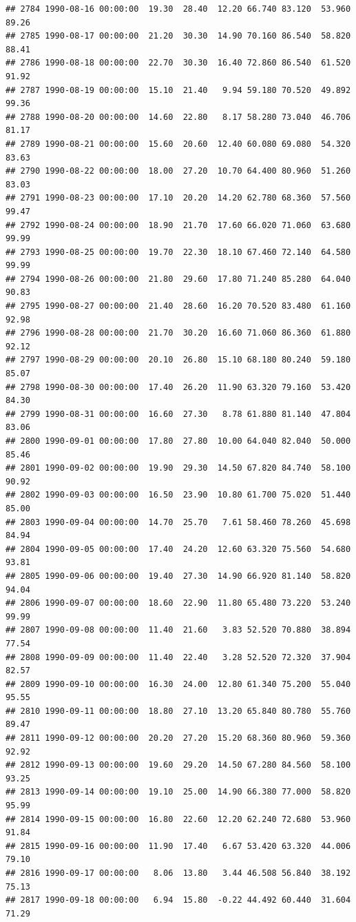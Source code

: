 \documentclass{article}\usepackage{graphicx, color}
\makeatletter
\newenvironment{kframe}{%
 \def\at@end@of@kframe{}%
 \ifinner\ifhmode%
  \def\at@end@of@kframe{\end{minipage}}%
  \begin{minipage}{\columnwidth}%
 \fi\fi%
 \def\FrameCommand##1{\hskip\@totalleftmargin \hskip-\fboxsep
 \colorbox{shadecolor}{##1}\hskip-\fboxsep
     \hskip-\linewidth \hskip-\@totalleftmargin \hskip\columnwidth}%
 \MakeFramed {\advance\hsize-\width
   \@totalleftmargin\z@ \linewidth\hsize
   \@setminipage}}%
 {\par\unskip\endMakeFramed%
 \at@end@of@kframe}
\newenvironment{knitrout}{}{} %
\makeatother
\begin{document}
\begin{knitrout}
\begin{kframe}
\begin{verbatim}
## 2784 1990-08-16 00:00:00  19.30  28.40  12.20 66.740 83.120  53.960  89.26
## 2785 1990-08-17 00:00:00  21.20  30.30  14.90 70.160 86.540  58.820  88.41
## 2786 1990-08-18 00:00:00  22.70  30.30  16.40 72.860 86.540  61.520  91.92
## 2787 1990-08-19 00:00:00  15.10  21.40   9.94 59.180 70.520  49.892  99.36
## 2788 1990-08-20 00:00:00  14.60  22.80   8.17 58.280 73.040  46.706  81.17
## 2789 1990-08-21 00:00:00  15.60  20.60  12.40 60.080 69.080  54.320  83.63
## 2790 1990-08-22 00:00:00  18.00  27.20  10.70 64.400 80.960  51.260  83.03
## 2791 1990-08-23 00:00:00  17.10  20.20  14.20 62.780 68.360  57.560  99.47
## 2792 1990-08-24 00:00:00  18.90  21.70  17.60 66.020 71.060  63.680  99.99
## 2793 1990-08-25 00:00:00  19.70  22.30  18.10 67.460 72.140  64.580  99.99
## 2794 1990-08-26 00:00:00  21.80  29.60  17.80 71.240 85.280  64.040  90.83
## 2795 1990-08-27 00:00:00  21.40  28.60  16.20 70.520 83.480  61.160  92.98
## 2796 1990-08-28 00:00:00  21.70  30.20  16.60 71.060 86.360  61.880  92.12
## 2797 1990-08-29 00:00:00  20.10  26.80  15.10 68.180 80.240  59.180  85.07
## 2798 1990-08-30 00:00:00  17.40  26.20  11.90 63.320 79.160  53.420  84.30
## 2799 1990-08-31 00:00:00  16.60  27.30   8.78 61.880 81.140  47.804  83.06
## 2800 1990-09-01 00:00:00  17.80  27.80  10.00 64.040 82.040  50.000  85.46
## 2801 1990-09-02 00:00:00  19.90  29.30  14.50 67.820 84.740  58.100  90.92
## 2802 1990-09-03 00:00:00  16.50  23.90  10.80 61.700 75.020  51.440  85.00
## 2803 1990-09-04 00:00:00  14.70  25.70   7.61 58.460 78.260  45.698  84.94
## 2804 1990-09-05 00:00:00  17.40  24.20  12.60 63.320 75.560  54.680  93.81
## 2805 1990-09-06 00:00:00  19.40  27.30  14.90 66.920 81.140  58.820  94.04
## 2806 1990-09-07 00:00:00  18.60  22.90  11.80 65.480 73.220  53.240  99.99
## 2807 1990-09-08 00:00:00  11.40  21.60   3.83 52.520 70.880  38.894  77.54
## 2808 1990-09-09 00:00:00  11.40  22.40   3.28 52.520 72.320  37.904  82.57
## 2809 1990-09-10 00:00:00  16.30  24.00  12.80 61.340 75.200  55.040  95.55
## 2810 1990-09-11 00:00:00  18.80  27.10  13.20 65.840 80.780  55.760  89.47
## 2811 1990-09-12 00:00:00  20.20  27.20  15.20 68.360 80.960  59.360  92.92
## 2812 1990-09-13 00:00:00  19.60  29.20  14.50 67.280 84.560  58.100  93.25
## 2813 1990-09-14 00:00:00  19.10  25.00  14.90 66.380 77.000  58.820  95.99
## 2814 1990-09-15 00:00:00  16.80  22.60  12.20 62.240 72.680  53.960  91.84
## 2815 1990-09-16 00:00:00  11.90  17.40   6.67 53.420 63.320  44.006  79.10
## 2816 1990-09-17 00:00:00   8.06  13.80   3.44 46.508 56.840  38.192  75.13
## 2817 1990-09-18 00:00:00   6.94  15.80  -0.22 44.492 60.440  31.604  71.29

\end{verbatim}
\end{kframe}
\end{knitrout}
\end{document}
